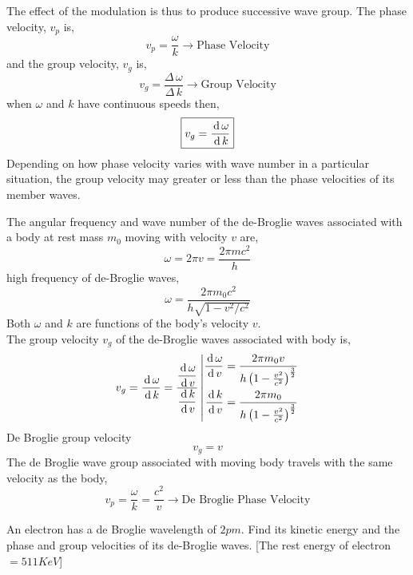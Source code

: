 \documentclass[../main.tex]{subfiles}
\begin{document}
The effect of the modulation is thus to produce successive wave group. The phase velocity, $ v_p $ is,
\[\boxed{v_p=\frac{\omega}{k}}\longrightarrow\text{Phase Velocity}\]
and the group velocity, $ v_g $ is,
\[\boxed{v_g=\frac{\Delta\,\omega}{\Delta\,k}}\longrightarrow\text{Group Velocity}\]
when $\omega $ and $ k $ have continuous speeds then,
\[\boxed{v_g=\frac{\,\mathrm{d}\, \omega}{\,\mathrm{d}\, k}}\]
Depending on how phase velocity varies with wave number in a particular situation, the group velocity may greater or less than the phase velocities of its member waves.

The angular frequency and wave number of the de-Broglie waves associated with a body at rest mass $ m_0 $ moving with velocity $ v $ are,
\[
    \omega=2\pi v=\frac{2\pi m c^2}{h}
\]
high frequency of de-Broglie waves,
\[\omega=\frac{2\pi m_0 c^2}{h\sqrt{1-v^2/c^2}}\]
Both $ \omega $ and $ k $ are functions of the body's velocity $ v $.\\
The group velocity $ v_g $ of the de-Broglie waves associated with body is,
\[v_g=\frac{\,\mathrm{d}\,\omega }{\,\mathrm{d}\, k}=\frac{\displaystyle\frac{\,\mathrm{d}\, \omega}{\,\mathrm{d}\, v}}{\displaystyle\frac{\,\mathrm{d}\, k}{\,\mathrm{d}\, v}}\left\vert\begin{aligned}
    \frac{\,\mathrm{d}\,\omega}{\,\mathrm{d}\, v}&=\frac{2\pi m_0v}{h\left( 1-\frac{v^2}{c^2} \right)^\frac{3}{2}}\\
    \frac{\,\mathrm{d}\, k}{\,\mathrm{d}\, v}&=\frac{2\pi m_0}{h\left( 1-\frac{v^2}{c^2} \right)^\frac{3}{2}}
\end{aligned}\right.\]
De Broglie group velocity
\[\boxed{v_g=v}\]
The de Broglie wave group associated with moving body travels with the same velocity as the body,
\[\boxed{v_p=\frac{\omega}{k}=\frac{c^2}{v}}\longrightarrow\text{De Broglie Phase Velocity}\]
\begin{prob}
    An electron has a de Broglie wavelength of $ 2 pm $. Find its kinetic energy and the phase and group velocities of its de-Broglie waves. [The rest energy of electron$ =511KeV $]
\end{prob}
\end{document}
